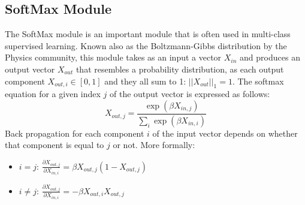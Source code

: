 \subsection{SoftMax Module}

The SoftMax module is an important module that is often used in multi-class supervised learning.
Known also as the Boltzmann-Gibbs distribution by the Physics community, this module takes as an input a vector $X_{in}$ and produces an output vector $X_{out}$ that resembles a probability distribution, as each output component $X_{out, i} \in [0, 1]$ and they all sum to 1: $||X_{out}||_1 = 1$.
The softmax equation for a given index $j$ of the output vector is expressed as follows: $$X_{out, j} = \frac{\exp(\beta X_{in, j})}{\sum_i{\exp(\beta X_{in, i})}}$$ Back propagation for each component $i$ of the input vector depends on whether that component is equal to $j$ or not.
More formally:
\begin{itemize}
    \item $i = j$: $\frac{\partial X_{out, j}}{\partial X_{in, i}} = \beta X_{out, j}(1 - X_{out, j})$
    \item $i \neq j$: $\frac{\partial X_{out, j}}{\partial X_{in, i}} = -\beta X_{out, i}X_{out, j}$
\end{itemize}


